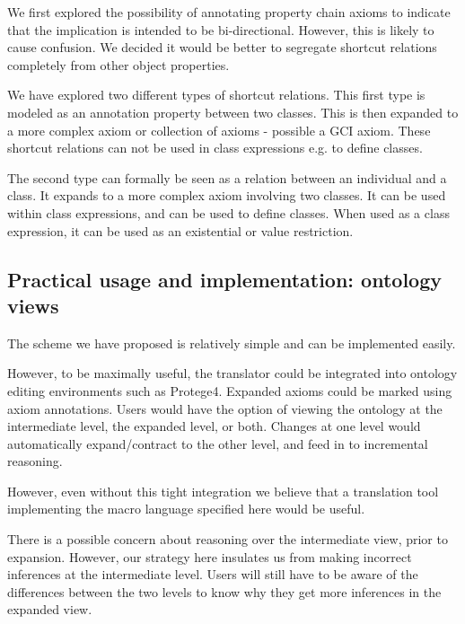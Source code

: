 \documentclass[11pt]{article}
\begin{document}
We first explored the possibility of annotating property chain axioms
to indicate that the implication is intended to be
bi-directional. However, this is likely to cause confusion. We decided
it would be better to segregate shortcut relations completely from
other object properties.

We have explored two different types of shortcut relations. This first
type is modeled as an annotation property between two classes. This is
then expanded to a more complex axiom or collection of axioms -
possible a GCI axiom. These shortcut relations can not be used in
class expressions e.g. to define classes.

The second type can formally be seen as a relation between an
individual and a class. It expands to a more complex axiom involving
two classes. It can be used within class expressions, and can be used
to define classes. When used as a class expression, it can be used as
an existential or value restriction.

\subsection{Practical usage and implementation: ontology views}

The scheme we have proposed is relatively simple and can be
implemented easily.

However, to be maximally useful, the translator could be integrated
into ontology editing environments such as Protege4\cite{P4}. Expanded
axioms could be marked using axiom annotations. Users would have the
option of viewing the ontology at the intermediate level, the expanded
level, or both. Changes at one level would automatically
expand/contract to the other level, and feed in to incremental
reasoning.

However, even without this tight integration we believe that a
translation tool implementing the macro language specified here would
be useful.

There is a possible concern about reasoning over the intermediate
view, prior to expansion. However, our strategy here insulates us from
making incorrect inferences at the intermediate level. Users will
still have to be aware of the differences between the two levels to
know why they get more inferences in the expanded view.

\end{document}
